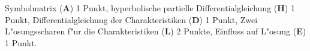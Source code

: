 \begin{bewertung}
Symbolmatrix ({\bf A}) 1 Punkt,
hyperbolische partielle Differentialgleichung ({\bf H}) 1 Punkt,
Differentialgleichung der Charakteristiken ({\bf D}) 1 Punkt,
Zwei L"osungsscharen f"ur die Charakteristiken ({\bf L}) 2 Punkte,
Einfluss auf L"osung ({\bf E}) 1 Punkt.
\end{bewertung}



